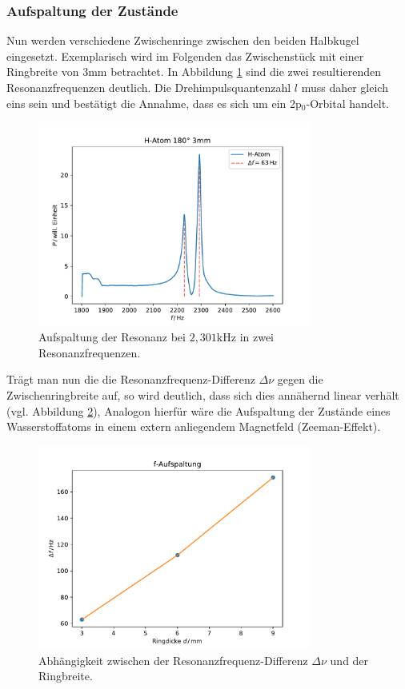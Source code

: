 \subsubsection*{Aufspaltung der Zustände}
Nun werden verschiedene Zwischenringe zwischen den beiden Halbkugel eingesetzt.
Exemplarisch wird im Folgenden das Zwischenstück mit einer Ringbreite von $3$mm betrachtet. In Abbildung \ref{fig:aufspaltung} sind die zwei resultierenden Resonanzfrequenzen
deutlich. Die Drehimpulsquantenzahl $l$ muss daher gleich eins sein und bestätigt die Annahme, dass es sich um ein 2p$_0$-Orbital handelt.  

\begin{figure}[H]
    \center
    \includegraphics[width=0.8\textwidth]{plots/Hatom/zustandsaufspaltung.pdf}
    \caption{Aufspaltung der Resonanz bei $2,301$kHz in zwei Resonanzfrequenzen.}
    \label{fig:aufspaltung}
\end{figure}

Trägt man nun die die Resonanzfrequenz-Differenz $\Delta\nu$ gegen die Zwischenringbreite auf,
so wird deutlich, dass sich dies annähernd linear verhält (vgl. Abbildung \ref{fig:d_res}),
Analogon hierfür wäre die Aufspaltung der Zustände eines Wasserstoffatoms in einem extern anliegendem Magnetfeld (Zeeman-Effekt).

\begin{figure}[H]
    \center
    \includegraphics[width=0.8\textwidth]{plots/Hatom/faufspaltung.pdf}
    \caption{Abhängigkeit zwischen der Resonanzfrequenz-Differenz $\Delta\nu$ und der Ringbreite.}
    \label{fig:d_res}
\end{figure}
\newpage
